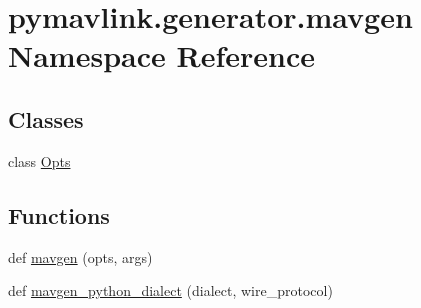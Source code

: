 \hypertarget{namespacepymavlink_1_1generator_1_1mavgen}{}\section{pymavlink.\+generator.\+mavgen Namespace Reference}
\label{namespacepymavlink_1_1generator_1_1mavgen}
\subsection*{Classes}
\begin{DoxyCompactItemize}
\item 
class \hyperlink{classpymavlink_1_1generator_1_1mavgen_1_1Opts}{Opts}
\end{DoxyCompactItemize}
\subsection*{Functions}
\begin{DoxyCompactItemize}
\item 
def \hyperlink{namespacepymavlink_1_1generator_1_1mavgen_a457749ca62432f0cf01d11d6a0a6e09e}{mavgen} (opts, args)
\item 
def \hyperlink{namespacepymavlink_1_1generator_1_1mavgen_a9dcfcc3bcf015ac643dc9335255a40df}{mavgen\+\_\+python\+\_\+dialect} (dialect, wire\+\_\+protocol)
\end{DoxyCompactItemize}
